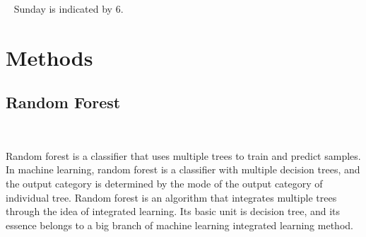 \ 
                       Sunday \hspace*{1.8cm} is indicated by 6.

\section{Methods}



\subsection{Random Forest}
\ 

Random forest is a classifier that uses multiple trees to train and predict samples. In machine learning, random forest is a classifier with multiple decision trees, and the output category is determined by the mode of the output category of individual tree. Random forest is an algorithm that integrates multiple trees through the idea of integrated learning. Its basic unit is decision tree, and its essence belongs to a big branch of machine learning integrated learning method.



